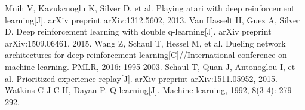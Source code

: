 \documentclass[a4paper,12pt]{article}
\begin{document}
\begin{CJK}{UTF8}{gbsn}
\newpage
\renewcommand\refname{参考文献}
\begin{thebibliography}{99}
	Mnih V, Kavukcuoglu K, Silver D, et al. Playing atari with deep reinforcement learning[J]. arXiv preprint arXiv:1312.5602, 2013.
	Van Hasselt H, Guez A, Silver D. Deep reinforcement learning with double q-learning[J]. arXiv preprint arXiv:1509.06461, 2015.
	Wang Z, Schaul T, Hessel M, et al. Dueling network architectures for deep reinforcement learning[C]//International conference on machine learning. PMLR, 2016: 1995-2003.
	Schaul T, Quan J, Antonoglou I, et al. Prioritized experience replay[J]. arXiv preprint arXiv:1511.05952, 2015.
	Watkins C J C H, Dayan P. Q-learning[J]. Machine learning, 1992, 8(3-4): 279-292.
\end{thebibliography}
\end{CJK}
\end{document}
